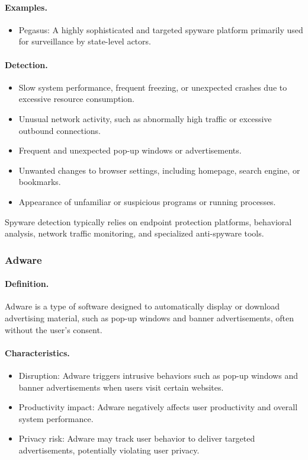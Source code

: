 \paragraph{Examples.}
\begin{itemize}
  \item Pegasus: A highly sophisticated and targeted spyware platform primarily used for surveillance by state-level actors.
\end{itemize}

\paragraph{Detection.}
\begin{itemize}
  \item Slow system performance, frequent freezing, or unexpected crashes due to excessive resource consumption.
  \item Unusual network activity, such as abnormally high traffic or excessive outbound connections.
  \item Frequent and unexpected pop-up windows or advertisements.
  \item Unwanted changes to browser settings, including homepage, search engine, or bookmarks.
  \item Appearance of unfamiliar or suspicious programs or running processes.
\end{itemize}

Spyware detection typically relies on endpoint protection platforms, behavioral analysis, network traffic monitoring, and specialized anti-spyware tools.

\subsubsection{Adware}

\paragraph{Definition.}
Adware is a type of software designed to automatically display or download advertising material, such as pop-up windows and banner advertisements, often without the user's consent.

\paragraph{Characteristics.}
\begin{itemize}
  \item Disruption: Adware triggers intrusive behaviors such as pop-up windows and banner advertisements when users visit certain websites.
  \item Productivity impact: Adware negatively affects user productivity and overall system performance.
  \item Privacy risk: Adware may track user behavior to deliver targeted advertisements, potentially violating user privacy.
\end{itemize}

